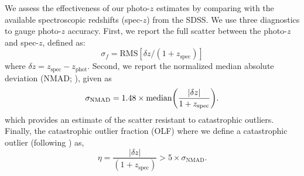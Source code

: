 \documentclass[apj, revtex4-1]{emulateapj}
\begin{document}
We assess the effectiveness of our photo-$z$ estimates by comparing with the available spectroscopic redshifts (spec-$z$) from the SDSS. We use three diagnostics to gauge photo-$z$ accuracy. First, we report the full scatter between the photo-$z$ and spec-$z$, defined as:
\begin{equation}\label{eqn:scatter}
	\sigma_f = \mathrm{RMS}[\delta z/(1+z_\mathrm{spec})]
\end{equation}
where $\delta z = z_\mathrm{spec} - z_\mathrm{phot}$. Second, we report the normalized median absolute deviation (NMAD; \citealt{Ilbert2009, Dahlen2013, Molino2017}), given as
\begin{equation}\label{eqn:nmad}
	\sigma_\mathrm{NMAD} = 1.48 \times \mathrm{median} \bigg{(} \frac{|\delta z|}{1+z_\mathrm{spec}} \bigg{)}.
\end{equation}
which provides an estimate of the scatter resistant to catastrophic outliers. Finally, the catastrophic outlier fraction (OLF) where we define a catastrophic outlier (following \citealt{Molino2017}) as,
\begin{equation}\label{eqn:OLF}
	\eta = \frac{|\delta z|}{(1+z_\mathrm{spec})} > 5 \times \sigma_\mathrm{NMAD}.
\end{equation}
\end{document}
